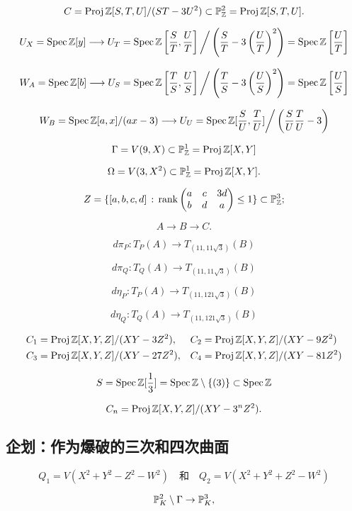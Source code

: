 \[
	C=\operatorname{Proj} \mathbb{Z}[S,T,U]/(ST-3U^2)\subset \mathbb P_{\mathbb{Z}}^2=\operatorname{Proj} \mathbb{Z}[S,T,U].
\]


\[
	U_X=\operatorname{Spec} \mathbb{Z}[y]\longrightarrow U_T=\operatorname{Spec} \mathbb{Z} \left[\frac ST,\frac UT\right]\bigg / \left(\frac ST-3\left(\frac UT\right)^2\right)=\operatorname{Spec} \mathbb{Z} \left[\frac UT\right]
\]

\[
	W_A=\operatorname{Spec} \mathbb{Z}[b]\longrightarrow U_S=\operatorname{Spec} \mathbb{Z} \left[\frac TS,\frac US\right]\bigg / \left(\frac TS-3\left(\frac US\right)^2\right)=\operatorname{Spec} \mathbb{Z} \left[\frac US\right]
\]

\[
	W_B=\operatorname{Spec} \mathbb{Z}[a,x]/(ax-3)\longrightarrow U_U=\operatorname{Spec} \mathbb{Z}[\frac SU,\frac TU]\bigg / \left(\frac SU \frac TU-3\right)
\]

\[
	\Gamma = V(9,X)\subset \mathbb P_{\mathbb{Z}}^1=\operatorname{Proj} \mathbb{Z}[X,Y]
\]

\[
	\Omega=V(3,X^2)\subset \mathbb P_{\mathbb{Z}}^1=\operatorname{Proj} \mathbb{Z}[X,Y].
\]

\[
	Z=\{[a,b,c,d]\,:\,\operatorname{rank}\begin{pmatrix}
		a&c&3d\\ b&d&a
	\end{pmatrix}\leq 1\}\subset \mathbb P_{\mathbb{Z}}^3;
\]

\[
	A\longrightarrow B\longrightarrow C.
\]

\[
	d\pi_P:T_P(A)\longrightarrow T_{(11,11\sqrt 3)}(B)
\]

\[
	d\pi_Q:T_Q(A)\longrightarrow T_{(11,11\sqrt 3)}(B)
\]

\[
	d\eta_P:T_P(A)\longrightarrow T_{(11,121\sqrt 3)}(B)
\]


\[
	d\eta_Q:T_Q(A)\longrightarrow T_{(11,121\sqrt 3)}(B)
\]

\[
	\begin{aligned}
		&C_1=\operatorname{Proj} \mathbb{Z}[X,Y,Z]/(XY-3Z^2),&&C_2=\operatorname{Proj} \mathbb{Z}[X,Y,Z]/(XY-9Z^2)\\
		&C_3=\operatorname{Proj} \mathbb{Z}[X,Y,Z]/(XY-27Z^2),&&C_4=\operatorname{Proj} \mathbb{Z}[X,Y,Z]/(XY-81Z^2)
	\end{aligned}
\]

\[
	S=\operatorname{Spec} \mathbb{Z}[\frac 13]=\operatorname{Spec} \mathbb{Z}\setminus\{(3)\}\subset \operatorname{Spec} \mathbb{Z}
\]


\[
	C_n=\operatorname{Proj} \mathbb{Z}[X,Y,Z]/(XY-3^nZ^2).
\]

\subsection{企划：作为爆破的三次和四次曲面}\label{s:4.2.5}

\[
	Q_1=V(X^2+Y^2-Z^2-W^2)\quad \text{和}\quad Q_2=V(X^2+Y^2+Z^2-W^2)
\]


\[
	\mathbb{P}_K^2\setminus \Gamma\to \mathbb{P}_K^3,
\]